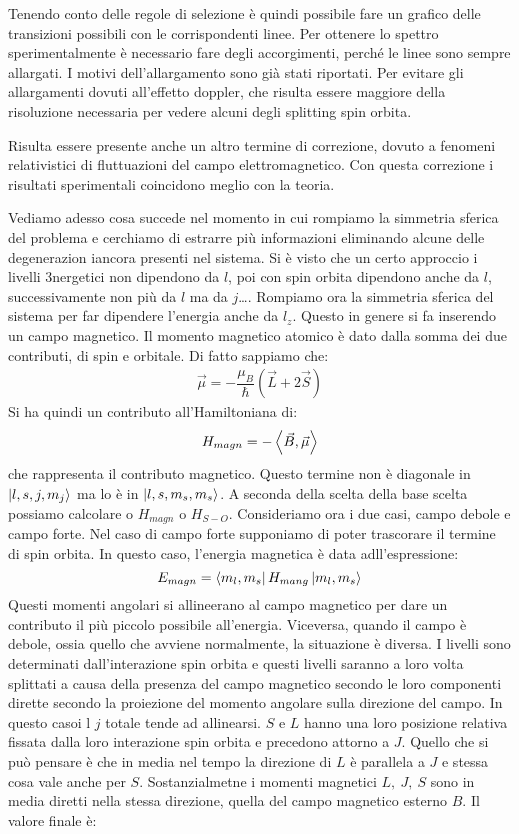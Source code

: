 \documentclass[../AppuntiStruttura]{subfiles}
\begin{document}
	Tenendo conto delle regole di selezione è quindi possibile fare un grafico delle transizioni possibili con le corrispondenti linee. Per ottenere lo spettro sperimentalmente è necessario fare degli accorgimenti,  perché le linee sono sempre allargati. I motivi dell'allargamento sono già stati riportati. Per evitare gli allargamenti dovuti all'effetto doppler, che risulta essere maggiore della risoluzione necessaria per vedere alcuni degli splitting spin orbita.
	
	Risulta essere presente anche un altro termine di correzione, dovuto a fenomeni relativistici di fluttuazioni del campo elettromagnetico. Con questa correzione i risultati sperimentali coincidono meglio con la teoria. 
	
	Vediamo adesso cosa succede nel momento in cui rompiamo la simmetria sferica del problema e cerchiamo di estrarre più informazioni eliminando alcune delle degenerazion iancora presenti nel sistema. Si è visto che un certo approccio i livelli 3nergetici non dipendono da $ l $, poi con spin orbita dipendono anche da $ l $, successivamente non più da $ l $ ma da $ j $\dots. Rompiamo ora la simmetria sferica del sistema per far dipendere l'energia anche da $ l_{z} $. Questo in genere si fa inserendo un campo magnetico. Il momento magnetico atomico è dato dalla somma dei due contributi, di spin e orbitale. Di fatto sappiamo che:
	\begin{gather}
	\vec{\mu}=-\dfrac{\mu_{B}}{\hbar}\left(\vec{L}+2\vec{S}\right)
	\end{gather}
	Si ha quindi un contributo all'Hamiltoniana di:
	\begin{gather}
		H_{magn}=-\left<\vec{B},\vec{\mu}\right>
	\end{gather}
	che rappresenta il contributo magnetico. Questo termine non è diagonale in $ \ket{l,s,j,m_{j}} $ ma lo è in $ \ket{l,s,m_{s},m_{s}} $. A seconda della scelta della base scelta possiamo calcolare o $ H_{magn} $ o $ H_{S-O} $.  Consideriamo ora i due casi, campo debole e campo forte. Nel caso di campo forte supponiamo di poter trascorare il termine di spin orbita. In questo caso, l'energia magnetica è data adll'espressione:
	$$ E_{magn}=\bra{m_{l},m_{s}}H_{mang}\ket{m_{l},m_{s}} $$
	Questi momenti angolari si allineerano al campo magnetico per dare un contributo il più piccolo possibile all'energia. Viceversa, quando il campo è debole, ossia quello che avviene normalmente, la situazione è diversa. I livelli sono determinati dall'interazione spin orbita e questi livelli saranno a loro volta splittati a causa della presenza del campo magnetico secondo le loro componenti dirette secondo la proiezione del momento angolare sulla direzione del campo. In questo casoi l $ j $ totale tende ad allinearsi. $ S $ e $ L $ hanno una loro posizione relativa fissata dalla loro interazione spin orbita e precedono attorno a $ J $. Quello che si può pensare è che in media nel tempo la direzione di $ L $ è parallela a $ J $ e stessa cosa vale anche per $ S $. Sostanzialmetne i momenti magnetici $ L,\ J,\ S $ sono in media diretti nella stessa direzione, quella del campo magnetico esterno $ B $. Il valore finale è:
\end{document}
